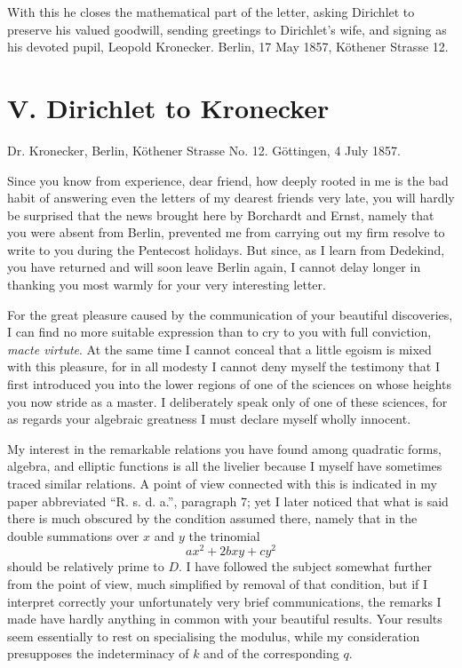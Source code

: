 \documentclass[11pt]{article}
\begin{document}
With this he closes the mathematical part of the letter, asking Dirichlet to preserve his valued goodwill, sending greetings to Dirichlet's wife, and signing as his devoted pupil, Leopold Kronecker. Berlin, 17 May 1857, Köthener Strasse 12.

\section*{V. Dirichlet to Kronecker}
Dr. Kronecker, Berlin, Köthener Strasse No. 12. Göttingen, 4 July 1857.

Since you know from experience, dear friend, how deeply rooted in me is the bad habit of answering even the letters of my dearest friends very late, you will hardly be surprised that the news brought here by Borchardt and Ernst, namely that you were absent from Berlin, prevented me from carrying out my firm resolve to write to you during the Pentecost holidays. But since, as I learn from Dedekind, you have returned and will soon leave Berlin again, I cannot delay longer in thanking you most warmly for your very interesting letter.

For the great pleasure caused by the communication of your beautiful discoveries, I can find no more suitable expression than to cry to you with full conviction, \emph{macte virtute}. At the same time I cannot conceal that a little egoism is mixed with this pleasure, for in all modesty I cannot deny myself the testimony that I first introduced you into the lower regions of one of the sciences on whose heights you now stride as a master. I deliberately speak only of one of these sciences, for as regards your algebraic greatness I must declare myself wholly innocent.

My interest in the remarkable relations you have found among quadratic forms, algebra, and elliptic functions is all the livelier because I myself have sometimes traced similar relations. A point of view connected with this is indicated in my paper abbreviated ``R. s. d. a.'', paragraph 7; yet I later noticed that what is said there is much obscured by the condition assumed there, namely that in the double summations over $x$ and $y$ the trinomial
\[
  ax^2+2bxy+cy^2
\]
should be relatively prime to $D$. I have followed the subject somewhat further from the point of view, much simplified by removal of that condition, but if I interpret correctly your unfortunately very brief communications, the remarks I made have hardly anything in common with your beautiful results. Your results seem essentially to rest on specialising the modulus, while my consideration presupposes the indeterminacy of $k$ and of the corresponding $q$.
\end{document}
